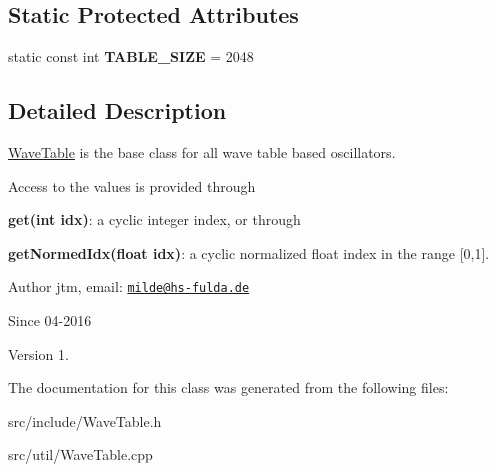\subsection*{Static Protected Attributes}
\begin{DoxyCompactItemize}
\item 
\hypertarget{classWaveTable_ae8fe89b58ec31a5beda1bfc79d1c39ad}{static const int {\bfseries T\-A\-B\-L\-E\-\_\-\-S\-I\-Z\-E} = 2048}\label{classWaveTable_ae8fe89b58ec31a5beda1bfc79d1c39ad}

\end{DoxyCompactItemize}


\subsection{Detailed Description}
\hyperlink{classWaveTable}{Wave\-Table} is the base class for all wave table based oscillators.

Access to the values is provided through


\begin{DoxyItemize}
\item {\bfseries get(int idx)}\-: a cyclic integer index, or through
\item {\bfseries get\-Normed\-Idx(float idx)}\-: a cyclic normalized float index in the range \mbox{[}0,1\mbox{]}.
\end{DoxyItemize}

\begin{DoxyAuthor}{Author}
jtm, email\-:  \href{mailto:milde@hs-fulda.de}{\tt milde@hs-\/fulda.\-de} 
\end{DoxyAuthor}
\begin{DoxySince}{Since}
04-\/2016 
\end{DoxySince}
\begin{DoxyVersion}{Version}
1. 
\end{DoxyVersion}


The documentation for this class was generated from the following files\-:\begin{DoxyCompactItemize}
\item 
src/include/Wave\-Table.\-h\item 
src/util/Wave\-Table.\-cpp\end{DoxyCompactItemize}
